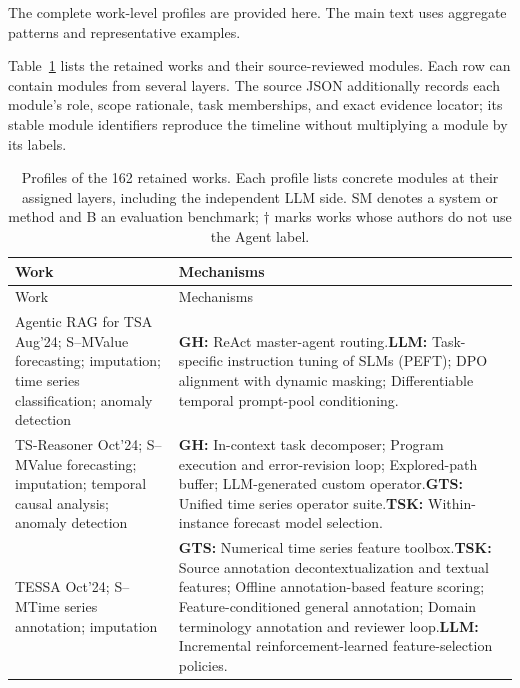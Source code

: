 \documentclass[preprints,article,submit,moreauthors]{Definitions/mdpi}
\newcommand{\typeSMshort}{\textsf{S--M}}
\begin{document}
The complete work-level profiles are provided here. The main text uses aggregate patterns and representative examples.

\begingroup
\scriptsize
\setlength{\tabcolsep}{3pt}
\renewcommand{\arraystretch}{1.02}
Table~\ref{tab:agent-ledger} lists the retained works and their source-reviewed modules. Each row can contain modules from several layers. The source JSON additionally records each module's role, scope rationale, task memberships, and exact evidence locator; its stable module identifiers reproduce the timeline without multiplying a module by its labels.
\begin{longtable}{@{}>{\raggedright\arraybackslash}p{}p{}@{}}
\caption{Profiles of the 162 retained works. Each profile lists concrete modules at their assigned layers, including the independent LLM side. SM denotes a system or method and B an evaluation benchmark; $\dagger$ marks works whose authors do not use the Agent label.}\label{tab:agent-ledger}\\
\toprule Work & Mechanisms\\\midrule
\endfirsthead
\toprule Work & Mechanisms\\\midrule
\endhead
Agentic RAG for TSA \citep{agenticrag2024} Aug'24; \typeSMshort{}\newline Value forecasting; imputation; time series classification; anomaly detection & \textbf{GH:} ReAct master-agent routing.\newline\textbf{LLM:} Task-specific instruction tuning of SLMs (PEFT); DPO alignment with dynamic masking; Differentiable temporal prompt-pool conditioning.\\\midrule
TS-Reasoner \citep{tsreasoner2026} Oct'24; \typeSMshort{}\newline Value forecasting; imputation; temporal causal analysis; anomaly detection & \textbf{GH:} In-context task decomposer; Program execution and error-revision loop; Explored-path buffer; LLM-generated custom operator.\newline\textbf{GTS:} Unified time series operator suite.\newline\textbf{TSK:} Within-instance forecast model selection.\\\midrule
TESSA \citep{tessa2024} Oct'24; \typeSMshort{}\newline Time series annotation; imputation & \textbf{GTS:} Numerical time series feature toolbox.\newline\textbf{TSK:} Source annotation decontextualization and textual features; Offline annotation-based feature scoring; Feature-conditioned general annotation; Domain terminology annotation and reviewer loop.\newline\textbf{LLM:} Incremental reinforcement-learned feature-selection policies.\\\midrule

\end{longtable}
\end{document}
